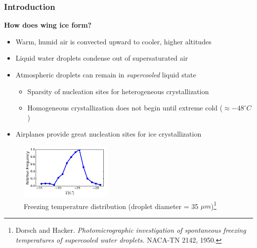 \documentclass[9pt]{beamer}
\begin{document}
\begin{frame}
\frametitle{Introduction}
\label{sec-1-4}

\textbf{How does wing ice form?}
\begin{itemize}
\item Warm, humid air is convected upward to cooler, higher altitudes
\item Liquid water droplets condense out of supersaturated air
\item Atmospheric droplets can remain in \emph{supercooled} liquid state
\begin{itemize}
\item Sparsity of nucleation sites for heterogeneous crystallization
\item Homogeneous crystallization does not begin until extreme cold ($\approx -48^\circ C$)
\end{itemize}
\item Airplanes provide great nucleation sites for ice crystallization
\end{itemize}
\vspace*{-0.0cm}\begin{figure}
      \includegraphics[width=0.4\textwidth]{DropletFreezingIntro.png}
      \caption{Freezing temperature distribution (droplet diameter =
      35 $\mu m$)\footnote{\tiny Dorsch and
      Hacker. \emph{Photomicrographic investigation of spontaneous
      freezing temperatures of supercooled water droplets.} NACA-TN
      2142, 1950.}} 
\end{figure}
\end{frame}
\end{document}
